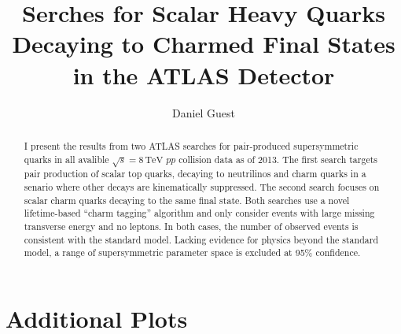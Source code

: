 \documentclass{report}
\title{Serches for Scalar Heavy Quarks Decaying to Charmed Final States in the ATLAS Detector}
\author{Daniel Guest}
\newcommand{\cmenergy}{\sqrt{s} = 8\,\text{TeV}}
\begin{document}
\maketitle
\tableofcontents

\begin{abstract}
I present the results from two ATLAS searches for pair-produced
supersymmetric quarks in all avalible $\cmenergy$ $pp$ collision data as
of 2013. The first search targets pair production of scalar top quarks,
decaying to neutrilinos and charm quarks in a senario where other
decays are kinematically suppressed. The second search focuses
on scalar charm quarks decaying to the same final state. Both searches
use a novel lifetime-based ``charm tagging'' algorithm
and only consider events with large missing transverse
energy and no leptons. In both cases, the number of observed events is
consistent with the standard model. Lacking evidence for physics
beyond the standard model, a range of supersymmetric parameter space is
excluded at 95\% confidence.
\end{abstract}






\appendix
\appendixpage
\addappheadtotoc

\chapter{Additional Plots}





\end{document}
